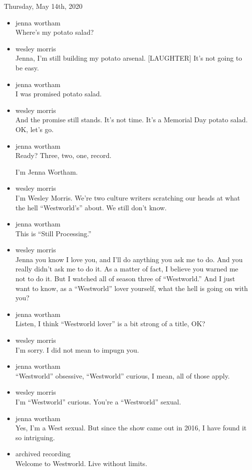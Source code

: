 Thursday, May 14th, 2020

\begin{itemize}
\item
  jenna wortham\\
  Where's my potato salad?
\item
  wesley morris\\
  Jenna, I'm still building my potato arsenal. {[}LAUGHTER{]} It's not
  going to be easy.
\item
  jenna wortham\\
  I was promised potato salad.
\item
  wesley morris\\
  And the promise still stands. It's not time. It's a Memorial Day
  potato salad. OK, let's go.
\item
  jenna wortham\\
  Ready? Three, two, one, record.

  I'm Jenna Wortham.
\item
  wesley morris\\
  I'm Wesley Morris. We're two culture writers scratching our heads at
  what the hell ``Westworld's'' about. We still don't know.
\item
  jenna wortham\\
  This is ``Still Processing.''
\item
  wesley morris\\
  Jenna you know I love you, and I'll do anything you ask me to do. And
  you really didn't ask me to do it. As a matter of fact, I believe you
  warned me not to do it. But I watched all of season three of
  ``Westworld.'' And I just want to know, as a ``Westworld'' lover
  yourself, what the hell is going on with you?
\item
  jenna wortham\\
  Listen, I think ``Westworld lover'' is a bit strong of a title, OK?
\item
  wesley morris\\
  I'm sorry. I did not mean to impugn you.
\item
  jenna wortham\\
  ``Westworld'' obsessive, ``Westworld'' curious, I mean, all of those
  apply.
\item
  wesley morris\\
  I'm ``Westworld'' curious. You're a ``Westworld'' sexual.
\item
  jenna wortham\\
  Yes, I'm a West sexual. But since the show came out in 2016, I have
  found it so intriguing.
\item
  archived recording\\
  Welcome to Westworld. Live without limits.
\end{itemize}

